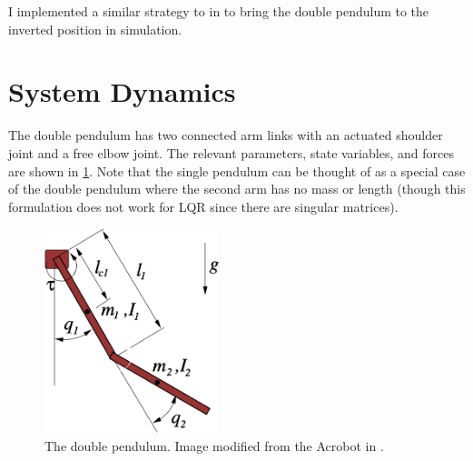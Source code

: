 \documentclass[conference]{IEEEtran}
\begin{document}
I implemented a similar strategy to \cite{albahkali} in to bring the double pendulum to the inverted position in simulation.

\section{System Dynamics}
The double pendulum has two connected arm links with an actuated shoulder joint and a free elbow joint. The relevant parameters, state variables, and forces are shown in \cref{fig:pendubot}. Note that the single pendulum can be thought of as a special case of the double pendulum where the second arm has no mass or length (though this formulation does not work for LQR since there are singular matrices).

\begin{figure}[ht]
	\centering
	\includegraphics[width=2in]{pendubot.png}
	\caption{The double pendulum. Image modified from the Acrobot in \cite{tedrake}.}
	\label{fig:pendubot}
\end{figure}
\end{document}

